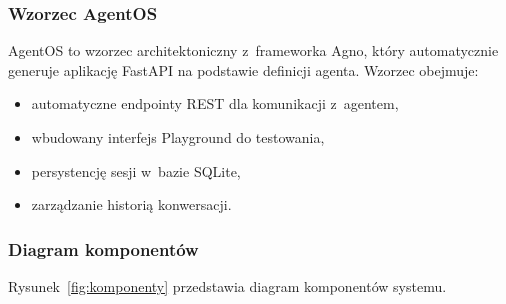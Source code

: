\subsubsection{Wzorzec AgentOS}

AgentOS to wzorzec architektoniczny z~frameworka Agno, który automatycznie generuje aplikację FastAPI na podstawie definicji agenta. Wzorzec obejmuje:

\begin{itemize}
    \item automatyczne endpointy REST dla komunikacji z~agentem,
    \item wbudowany interfejs Playground do testowania,
    \item persystencję sesji w~bazie SQLite,
    \item zarządzanie historią konwersacji.
\end{itemize}

\subsubsection{Diagram komponentów}

Rysunek~\ref{fig:komponenty} przedstawia diagram komponentów systemu.

